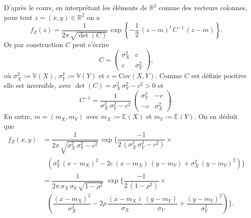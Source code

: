 \label{II-answer-covindepgauss-joint}
D'après le cours, en interprétant les éléments de \(\mathbb{R}^2\) comme
des vecteurs colonnes, pour tout \(z =(x,y)\in\mathbb{R}^2\) on a \[
f_Z(z) = \dfrac{1}{2\pi\,\sqrt{\det(C)}}\,\exp\left\{ -\dfrac{1}{2}\,\left(z - m\right)^t\,C^{-1}\,\left(z - m\right) \right\}.
\] Or par construction \(C\) peut s'écrire
\[C = \left( \begin{array}{cc} \sigma_X^2 & c\\ c & \sigma_Y^2 \end{array}\right), \]
où \(\sigma_X^2 := \mathbb{V}\left(X\right)\),
\(\sigma_Y^2 := \mathbb{V}\left(Y\right)\) et
\(c = \text{Cov}\left(X,Y\right)\). Comme \(C\) est définie positive
elle est inversible, avec \(\det(C) = \sigma_X^2\,\sigma_Y^2 - c^2 > 0\)
et
\[C^{-1} = \dfrac{1}{\sigma_X^2\,\sigma_Y^2 - c^2}\,\left( \begin{array}{cc} \sigma_Y^2 & -c\\ -c & \sigma_X^2 \end{array}\right).\]
En outre, \(m = \left(m_X, m_Y \right)\) avec \(m_X := \mathbb{E}(X)\)
et \(m_Y := \mathbb{E}(Y)\). On en déduit que \begin{align*}
f_Z(x,y) &= \dfrac{1}{2\pi\,\sqrt{\sigma_X^2\,\sigma_Y^2 - c^2}}\,\exp\biggl\{ \dfrac{-1}{2\,\left(\sigma_X^2\,\sigma_Y^2 - c^2 \right)}\times\\
&\ \ \ \left( \sigma_Y^2\,(x-m_X)^2 - 2c\,(x-m_X)\,(y-m_Y) + \sigma_X^2\,(y-m_Y)^2 \right) \biggr\}\\
&= \dfrac{1}{2\pi\,\sigma_X\,\sigma_Y\,\sqrt{1-\rho^2}}\,\,\exp\biggl\{ \dfrac{-1}{2\,\left( 1 - \rho^2 \right)}\times\\
&\ \ \ \left( \dfrac{(x-m_X)^2}{\sigma_X^2} - 2\rho\,\dfrac{(x-m_X)}{\sigma_X}\,\dfrac{(y-m_Y)}{\sigma_Y} + \dfrac{(y-m_Y)^2}{\sigma_Y^2} \right) \biggr\}.
\end{align*}

